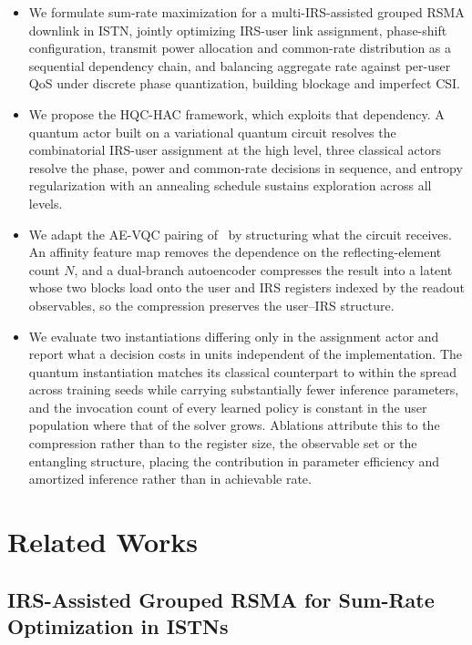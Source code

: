 \documentclass[12pt,onecolumn]{IEEEtran}
\begin{document}
\begin{itemize}
    \item We formulate sum-rate maximization for a multi-IRS-assisted grouped RSMA downlink in ISTN, jointly optimizing IRS-user link assignment, phase-shift configuration, transmit power allocation and common-rate distribution as a sequential dependency chain, and balancing aggregate rate against per-user QoS under discrete phase quantization, building blockage and imperfect CSI.

    \item We propose the HQC-HAC framework, which exploits that dependency.
    A quantum actor built on a variational quantum circuit resolves the combinatorial IRS-user assignment at the high level, three classical actors resolve the phase, power and common-rate decisions in sequence, and entropy regularization with an annealing schedule sustains exploration across all levels.

    \item We adapt the AE-VQC pairing of~\cite{nagy2025hybrid} by structuring what the circuit receives.
    An affinity feature map removes the dependence on the reflecting-element count $N$, and a dual-branch autoencoder compresses the result into a latent whose two blocks load onto the user and IRS registers indexed by the readout observables, so the compression preserves the user--IRS structure.

    \item We evaluate two instantiations differing only in the assignment actor and report
    what a decision costs in units independent of the implementation. The quantum
    instantiation matches its classical counterpart to within the spread across training
    seeds while carrying substantially fewer inference parameters, and the invocation
    count of every learned policy is constant in the user population where that of the
    solver grows. Ablations attribute this to the compression rather than to the register
    size, the observable set or the entangling structure, placing the contribution in
    parameter efficiency and amortized inference rather than in achievable rate.
\end{itemize}

\section{Related Works}
\label{sec:related}

\subsection{IRS-Assisted Grouped RSMA for Sum-Rate Optimization in ISTNs}
\end{document}
